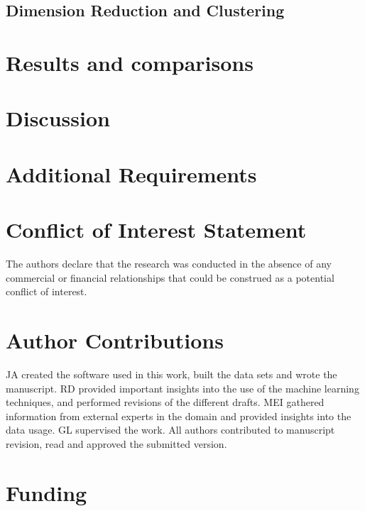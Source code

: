 \documentclass[utf8]{frontiersSCNS} %
\begin{document}
\subsection{Dimension Reduction and Clustering}


\section{Results and comparisons}


\section{Discussion}


\section{Additional Requirements}

\section*{Conflict of Interest Statement}

The authors declare that the research was conducted in the absence of any commercial or financial relationships that could be construed as a potential conflict of interest.

\section*{Author Contributions}

JA created the software used in this work, built the data sets and wrote the manuscript. RD provided important insights into the use of the machine learning techniques, and performed revisions of the different drafts. MEI gathered information from external experts in the domain and provided insights into the data usage. GL supervised the work. All authors contributed to manuscript revision, read and approved the submitted version.

\section*{Funding}
\end{document}
